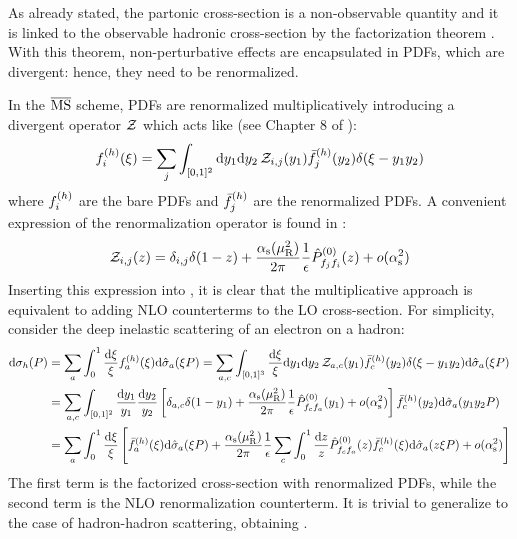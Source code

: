 As already stated, the partonic cross-section is a non-observable quantity and it is linked to the observable hadronic cross-section by the factorization theorem . With this theorem, non-perturbative effects are encapsulated in PDFs, which are divergent: hence, they need to be renormalized.

In the $ \overline{\text{MS}} $ scheme, PDFs are renormalized multiplicatively introducing a divergent operator $ \mathcal{Z} $ which acts like (see Chapter 8 of \cite{Collins-2011}):
\begin{equation}
  f_{i}^{(h)}(\xi) = \sum_j \int_{[0,1]^2} \mathrm{d} y_1 \mathrm{d} y_2 \, \mathcal{Z}_{i,j}(y_1) \bar{f}_{j}^{(h)}(y_2) \delta(\xi - y_1 y_2)
\end{equation}
where $ f_{i}^{(h)} $ are the bare PDFs and $ \bar{f}_{j}^{(h)} $ are the renormalized PDFs. A convenient expression of the renormalization operator is found in \cite{Curci-1980}:
\begin{equation}
  \mathcal{Z}_{i,j}(z) = \delta_{i,j} \delta(1-z) + \frac{\alpha_\text{s}(\mu_\text{R}^2)}{2\pi} \frac{1}{\epsilon} \hat{P}^{(0)}_{f_j f_i}(z) + o(\alpha_\text{s}^2)
  \label{eq:z-op-def}
\end{equation}
Inserting this expression into , it is clear that the multiplicative approach is equivalent to adding NLO counterterms to the LO cross-section. For simplicity, consider the deep inelastic scattering of an electron on a hadron:
\begin{equation*}
  \begin{split}
    \mathrm{d}\sigma_h(P)
    & = \sum_a \int_0^1 \frac{\mathrm{d} \xi}{\xi} f_{a}^{(h)}(\xi) \mathrm{d}\hat{\sigma}_a(\xi P) = \sum_{a,c} \int_{[0,1]^3} \frac{\mathrm{d} \xi}{\xi} \mathrm{d} y_1 \mathrm{d} y_2 \, \mathcal{Z}_{a,c}(y_1) \bar{f}_{c}^{(h)}(y_2) \delta(\xi - y_1 y_2) \mathrm{d}\hat{\sigma}_a(\xi P) \\
    & = \sum_{a,c} \int_{[0,1]^2} \frac{\mathrm{d} y_1}{y_1} \frac{\mathrm{d} y_2}{y_2} \left[ \delta_{a,c} \delta(1 - y_1) + \frac{\alpha_\text{s}(\mu_\text{R}^2)}{2\pi} \frac{1}{\epsilon} \hat{P}^{(0)}_{f_c f_a}(y_1) + o(\alpha_\text{s}^2) \right] \bar{f}_{c}^{(h)}(y_2) \mathrm{d}\hat{\sigma}_a(y_1 y_2 P) \\
    & = \sum_a \int_0^1 \frac{\mathrm{d} \xi}{\xi} \left[ \bar{f}_{a}^{(h)}(\xi) \mathrm{d}\hat{\sigma}_a(\xi P) + \frac{\alpha_\text{s}(\mu_\text{R}^2)}{2\pi} \frac{1}{\epsilon} \sum_{c} \int_0^1 \frac{\mathrm{d} z}{z} \hat{P}^{(0)}_{f_c f_a}(z) \bar{f}_{c}^{(h)}(\xi) \mathrm{d}\hat{\sigma}_a(z \xi P) + o(\alpha_\text{s}^2) \right]
  \end{split}
\end{equation*}
The first term is the factorized cross-section with renormalized PDFs, while the second term is the NLO renormalization counterterm. It is trivial to generalize to the case of hadron-hadron scattering, obtaining .


